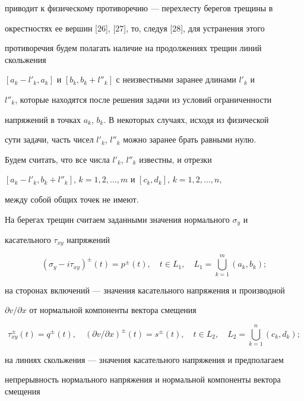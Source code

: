 приводит к физическому противоречию --- перехлесту берегов трещины в 


окрестностях ее вершин [26], [27], то, следуя [28], для устранения этого 


противоречия будем полагать наличие на продолжениях трещин линий скольжения 


$[a_k-l'_k,a_k]$ и $[b_k,b_k+l''_k]$ с неизвестными заранее длинами $l'_k$ и 


$l''_k$, которые находятся после решения задачи из условий ограниченности 


напряжений в точках $a_k$, $b_k$. В некоторых случаях, исходя из физической 


сути задачи, часть чисел $l'_k$, $l''_k$ можно заранее брать равными нулю. 


Будем считать, что все числа $l'_k$, $l''_k$ известны, и отрезки 


$[a_k-l'_k,b_k+l''_k]$, $k=1,2,\dotsc,m$ и $[c_k,d_k]$, $k=1,2,\dotsc,n$, 


между собой общих точек не имеют. 


 


На берегах трещин считаем заданными значения нормального $\sigma_y$ и 


касательного $\tau_{xy}$ напряжений 


\begin{equation} 


(\sigma_y-i\tau_{xy})^\pm(t)=p^\pm(t),\quad t\in L_1,\quad 


L_1=\bigcup^m_{k=1}(a_k,b_k); 


\end{equation} 


на сторонах включений --- значения касательного напряжения и производной 


$\partial v/\partial x$ от нормальной компоненты вектора смещения 


\begin{equation} 


\tau^\pm_{xy}(t)=q^\pm(t),\quad (\partial v/\partial x)^\pm(t)= 


s^\pm(t),\quad t\in L_2,\quad L_2=\bigcup^n_{k=1}(c_k,d_k); 


\end{equation} 


на линиях скольжения --- значения касательного напряжения и предполагаем 


непрерывность нормального напряжения и нормальной компоненты вектора смещения 


